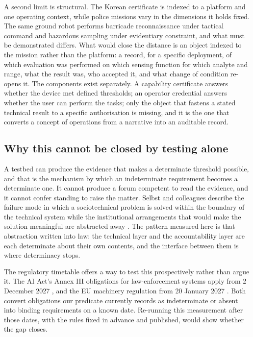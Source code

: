 A second limit is structural. The Korean certificate is indexed to a platform and one operating context, while police missions vary in the dimensions it holds fixed. The same ground robot performs barricade reconnaissance under tactical command and hazardous sampling under evidentiary constraint, and what must be demonstrated differs. What would close the distance is an object indexed to the mission rather than the platform: a record, for a specific deployment, of which evaluation was performed on which sensing function for which analyte and range, what the result was, who accepted it, and what change of condition re-opens it. The components exist separately. A capability certificate answers whether the device met defined thresholds; an operator credential answers whether the user can perform the tasks; only the object that fastens a stated technical result to a specific authorisation is missing, and it is the one that converts a concept of operations from a narrative into an auditable record.

\subsection{Why this cannot be closed by testing alone}\label{sec:4.5}

A testbed can produce the evidence that makes a determinate threshold possible, and that is the mechanism by which an indeterminate requirement becomes a determinate one. It cannot produce a forum competent to read the evidence, and it cannot confer standing to raise the matter. Selbst and colleagues describe the failure mode in which a sociotechnical problem is solved within the boundary of the technical system while the institutional arrangements that would make the solution meaningful are abstracted away \citep{Selbst2019Abstraction}. The pattern measured here is that abstraction written into law: the technical layer and the accountability layer are each determinate about their own contents, and the interface between them is where determinacy stops.

The regulatory timetable offers a way to test this prospectively rather than argue it. The AI Act's Annex III obligations for law-enforcement systems apply from 2 December 2027 \citep{EUAIAct2024,EUDigitalOmnibus2026}, and the EU machinery regulation from 20 January 2027 \citep{EUMachinery2023}. Both convert obligations our predicate currently records as indeterminate or absent into binding requirements on a known date. Re-running this measurement after those dates, with the rules fixed in advance and published, would show whether the gap closes.

